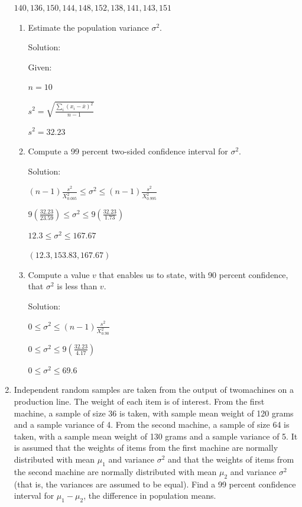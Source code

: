 \documentclass{article}
\begin{document}
\begin{enumerate}
    $140, 136, 150, 144, 148, 152, 138, 141, 143, 151$

    \begin{enumerate}
        \item Estimate the population variance $\sigma^2$.
        
        Solution: 

        Given:
        
        $n = 10$

        $\displaystyle s^2=\sqrt{\frac{\sum_i{(x_i-\bar{x})^2}}{n-1}}$

        $s^2 = 32.23$

        \item Compute a 99 percent two-sided confidence interval for $\sigma^2$.
        
        Solution: 

        $(n-1)\frac{s^2}{X_{0.005}^2} \leq \sigma^2 \leq (n-1)\frac{s^2}{X_{0.995}^2}$

        $\displaystyle 9\left(\frac{32.23}{23.59}\right) \leq \sigma^2 \leq 9\left(\frac{32.23}{1.73}\right)$

        $12.3 \leq \sigma^2 \leq 167.67$

        $(12.3, 153.83, 167.67)$

        \item Compute a value $v$ that enables us to state, with 90 percent confidence, that $\sigma^2$ is less than $v$.
        
        Solution: 

        $0 \leq \sigma^2 \leq (n-1)\frac{s^2}{X_{0.90}^2}$

        $0 \leq \sigma^2 \leq 9\left(\frac{32.23}{4.17}\right)$

        $0 \leq \sigma^2 \leq 69.6$

    \end{enumerate}
    \item Independent random samples are taken from the output of twomachines on a production line. 
    The weight of each item is of interest. From the first machine, a sample of size 36 is taken, with sample mean weight of 120 grams and a sample variance of 4.
    From the second machine, a sample of size 64 is taken, with a sample mean weight of 130 grams and a sample variance of 5.
    It is assumed that the weights of items from the first machine are normally distributed with mean $\mu_1$ and variance $\sigma^2$ and that the weights of items from the second machine are normally distributed with mean $\mu_2$ and variance $\sigma^2$ (that is, the variances are assumed to be equal). 
    Find a 99 percent confidence interval for $\mu_1 - \mu_2$, the difference in population means.
    

\end{enumerate}
\end{document}
